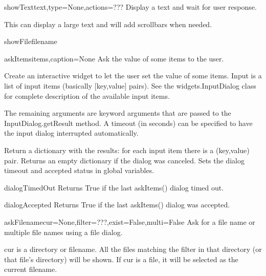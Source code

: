 \begin{funcdesc}{showText}{text,type=None,actions=???}
Display a text and wait for user response.

    This can display a large text and will add scrollbars when needed.
    

\end{funcdesc}


\begin{funcdesc}{showFile}{filename}


\end{funcdesc}


\begin{funcdesc}{askItems}{items,caption=None}
Ask the value of some items to the user.

    Create an interactive widget to let the user set the value of some items.
    Input is a list of input items (basically [key,value] pairs).
    See the widgets.InputDialog class for complete description of the
    available input items.

    The remaining arguments are keyword arguments that are passed to the
    InputDialog.getResult method.
    A timeout (in seconds) can be specified to have the input dialog
    interrupted automatically.

    Return a dictionary with the results: for each input item there is a
    (key,value) pair. Returns an empty dictionary if the dialog was canceled.
    Sets the dialog timeout and accepted status in global variables.
    

\end{funcdesc}


\begin{funcdesc}{dialogTimedOut}{}
Returns True if the last askItems() dialog timed out.

\end{funcdesc}


\begin{funcdesc}{dialogAccepted}{}
Returns True if the last askItems() dialog was accepted.

\end{funcdesc}


\begin{funcdesc}{askFilename}{cur=None,filter=???,exist=False,multi=False}
Ask for a file name or multiple file names using a file dialog.

    cur is a directory or filename. All the files matching the filter in that
    directory (or that file's directory) will be shown.
    If cur is a file, it will be selected as the current filename.
    

\end{funcdesc}


